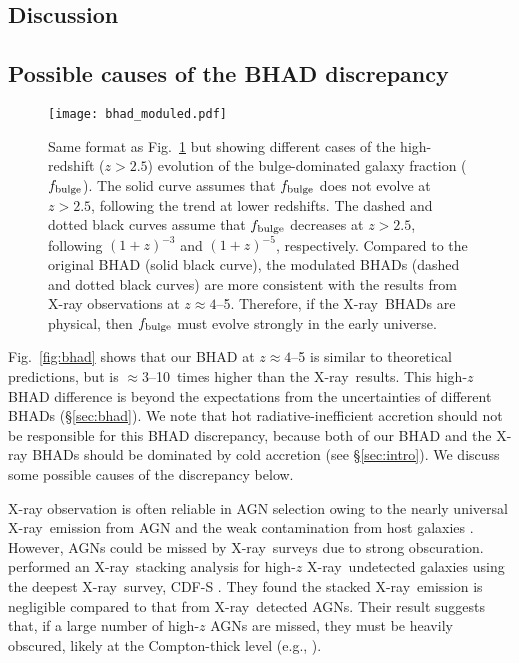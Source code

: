 \documentclass[twocolumn,twocolappendix,times]{aastex63}
\newcommand{\xray}{\hbox{X-ray}}  %
\newcommand{\fb}{f_{\rm bulge}}
\newcommand{\fst}[1]{#1}
\newcommand{\scd}[1]{#1}
\begin{document}
\begin{CJK*}{UTF8}{gbsn}
\section{Discussion}
\label{sec:discuss}

\subsection{Possible causes of the BHAD discrepancy}
\label{sec:err}
\begin{figure}
    \centering
	\texttt{[image: bhad\_moduled.pdf]}
    \caption{Same format as Fig.~\ref{fig:bhad_moduled} but 
    showing different cases of the high-redshift ($z>2.5$) 
    evolution of the bulge-dominated galaxy fraction 
    ($\fb$). 
    The solid curve assumes that $\fb$ does not evolve
    at $z>2.5$, following the trend at lower redshifts. 
    The dashed and dotted black curves assume that $\fb$ 
    decreases at $z>2.5$, following $(1+z)^{-3}$ and 
    $(1+z)^{-5}$, respectively. 
    \scd{Compared to the original BHAD (solid black curve), 
    the modulated BHADs (dashed and dotted black curves) are 
    more consistent with the results from X-ray observations 
    at $z\approx 4$--5.} 
    Therefore, if the \xray\ BHADs are physical, then $\fb$
    must evolve strongly in the early universe. 
    }
    \label{fig:bhad_moduled}
\end{figure}

\fst{Fig.~\ref{fig:bhad} shows that our BHAD at $z\approx 4$--5 is similar to theoretical predictions, but is $\approx$3--10~times higher than the \xray\ results.
This high-$z$ BHAD difference is beyond the expectations from the uncertainties of different BHADs (\S\ref{sec:bhad}).
We note that hot radiative-inefficient accretion should not be responsible for this BHAD discrepancy, because both of our BHAD and the X-ray BHADs should be dominated by cold accretion (see \S\ref{sec:intro}).
We discuss some possible causes of the discrepancy below.}

X-ray observation is often reliable in AGN selection owing to the nearly universal \xray\ emission from AGN and the weak contamination from host galaxies \citep[e.g.,][]{brandt15}.
However, AGNs could be missed by \xray\ surveys due to strong obscuration. 
\cite{vito16} performed an \xray\ stacking analysis for 
high-$z$ \xray\ undetected galaxies using the deepest \xray\ 
survey, \hbox{CDF-S} \citep{luo17}.
They found the stacked \xray\ emission is negligible compared
to that from \xray\ detected AGNs. 
Their result suggests that, if a large number of high-$z$ AGNs 
are missed, they must be heavily obscured, likely at the 
Compton-thick level (e.g., \citealt{hickox18}).


\end{CJK*}
\end{document}
